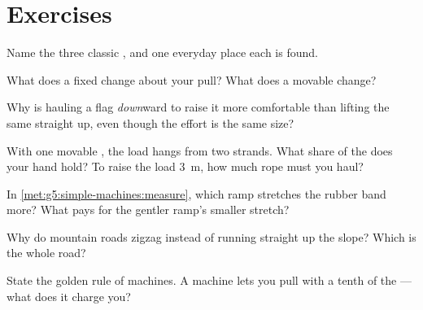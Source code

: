 \section{Exercises}

\begin{exercise}[$\star$]\label{exo:g5:simple-machines:1}
Name the three classic , and one everyday place each
is found.
\end{exercise}

\begin{exercise}[$\star$]\label{exo:g5:simple-machines:2}
What does a fixed  change about your pull? What does a
movable  change?
\end{exercise}

\begin{exercise}[$\star$]\label{exo:g5:simple-machines:3}
Why is hauling a flag \emph{down}ward to raise it more comfortable
than lifting the same  straight up, even though the effort is
the same size?
\end{exercise}

\begin{exercise}[$\star$]\label{exo:g5:simple-machines:4}
With one movable , the load hangs from two strands. What
share of the  does your hand hold? To raise the load
\qty{3}{m}, how much rope must you haul?
\end{exercise}

\begin{exercise}[$\star$]\label{exo:g5:simple-machines:5}
In \cref{met:g5:simple-machines:measure}, which ramp stretches the
rubber band more? What pays for the gentler ramp's smaller
stretch?
\end{exercise}

\begin{exercise}[$\star$]\label{exo:g5:simple-machines:6}
Why do mountain roads zigzag instead of running straight up the
slope? Which  is the whole road?
\end{exercise}

\begin{exercise}[$\star$]\label{exo:g5:simple-machines:7}
State the golden rule of machines. A machine lets you pull with a
tenth of the  --- what does it charge you?
\end{exercise}

